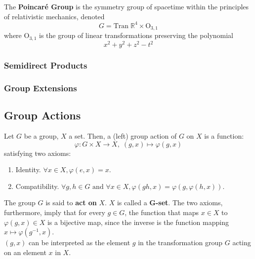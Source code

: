   \begin{example}
    The \textbf{Poincaré Group} is the symmetry group of spacetime within the principles of relativistic mechanics, denoted
    \begin{equation}
      G = \text{Tran}\; \mathbb{R}^{4} \times \text{O}_{3,1}
    \end{equation}
    where O$_{3,1}$ is the group of linear transformations preserving the polynomial 
    \begin{equation}
      x^{2} + y^{2} + z^{2} - t^{2}
    \end{equation}
  \end{example} 

\subsubsection{Semidirect Products} 

\subsubsection{Group Extensions}

\subsection{Group Actions}

  \begin{definition}
    Let $G$ be a group, $X$ a set. Then, a (left) group action of $G$ on $X$ is a function: 
    \begin{equation}
      \varphi: G \times X \longrightarrow X, \; (g,x) \longmapsto \varphi(g,x)
    \end{equation}
    satisfying two axioms:
    \begin{enumerate}
      \item Identity. $\forall x \in X, \varphi(e, x) = x$. 
      \item Compatibility. $\forall g, h \in G \text{ and } \forall x \in X, \varphi(gh, x) = \varphi(g, \varphi(h, x))$.
    \end{enumerate}
    The group $G$ is said to \textbf{act on} $X$. $X$ is called a \textbf{G-set}. The two axioms, furthermore, imply that for every $g \in G$, the function that maps $x \in X$ to $ \varphi(g, x) \in X$ is a bijective map, since the inverse is the function mapping $x \mapsto \varphi(g^{-1}, x)$. \\
    $(g, x)$ can be interpreted as the element $g$ in the transformation group $G$ acting on an element $x$ in $X$.
  \end{definition}

